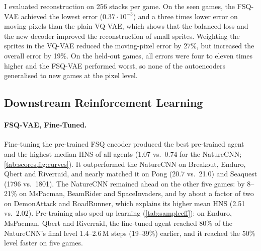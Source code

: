 \documentclass[runningheads]{llncs}
\begin{document}
I evaluated reconstruction on 256 stacks per game. On the seen games,
the FSQ-VAE achieved the lowest error ($0.37\cdot10^{-3}$) and a three times lower error on
moving pixels than the plain VQ-VAE, which shows that the balanced loss and the new decoder
improved the reconstruction of small sprites. Weighting the sprites in the VQ-VAE reduced the
moving-pixel error by 27\%, but increased the overall error by 19\%. On the held-out games, all
errors were four to eleven times higher and the FSQ-VAE performed worst, so none of the
autoencoders generalised to new games at the pixel level.

\FloatBarrier
\subsection{Downstream Reinforcement Learning}
\label{sec:rl}

\paragraph{FSQ-VAE, Fine-Tuned.} Fine-tuning the pre-trained FSQ encoder produced the best
pre-trained agent and the highest median HNS of all agents (1.07 vs.\ 0.74 for the NatureCNN;
\cref{tab:scores,fig:curves}). It outperformed the NatureCNN on Breakout, Enduro, Qbert and
Riverraid, and nearly matched it on Pong (20.7 vs.\ 21.0) and Seaquest (1796 vs.\ 1801). The
NatureCNN remained ahead on the other five games: by 8--21\% on MsPacman, BeamRider and
SpaceInvaders, and by about a factor of two on DemonAttack and RoadRunner, which explains its
higher mean HNS (2.51 vs.\ 2.02). Pre-training also sped up learning (\cref{tab:sampleeff}): on
Enduro, MsPacman, Qbert and Riverraid, the fine-tuned agent reached 80\% of the NatureCNN's
final level 1.4--2.6\,M steps (19--39\%) earlier, and it reached the 50\% level faster on five
games.

\begin{table}[!htbp]
\centering
\caption{Mean episode return over the last 10\% of 10\,M training steps (single seed); best
per game in bold. $^\dagger$\,held-out games, not used for pre-training. Std-VAE and Res-VQ
scores, and NatureCNN and V-JEPA scores on the held-out games, are rounded as recorded. V-JEPA with the flattened feature; the pooled variant is in
\cref{tab:jepa-abl}.}
\label{tab:scores}
\footnotesize\setlength{\tabcolsep}{3pt}
\end{table}
\end{document}
